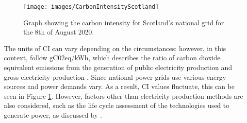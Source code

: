 \documentclass{l4proj}
\begin{document}
\begin{figure}[h]
    \centering
    \texttt{[image: images/CarbonIntensityScotland]}
    ~
    \caption{Graph showing the carbon intensity for Scotland's national grid for the 8th of August 2020.}
    \label{fig:carbonIntensityScotland}
\end{figure}

The units of CI can vary depending on the circumstances; however, in this context, follow gC02eq/kWh, which describes the ratio of carbon dioxide equivalent emissions from the generation of public electricity production and gross electricity production \citep{EEA_CO2_emission_intensity}.
Since national power grids use various energy sources and power demands vary.
As a result, CI values fluctuate, this can be seen in Figure \ref{fig:carbonIntensityScotland}.
However, factors other than electricity production methods are also considered, such as the life cycle assessment of the technologies used to generate power, as discussed by \cite{PEHNT200655}.

%
%
\end{document}
